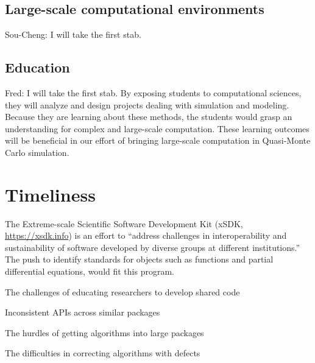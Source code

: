 \documentclass{amsart}
\newcommand{\FJHNote}[1]{{\color{blue}Fred: #1}}
\newcommand{\SCTCNote}[1]{{\color{green}Sou-Cheng: #1}}
\begin{document}
\subsection{Large-scale computational environments} \SCTCNote{I will take the first stab.}

\subsection{Education} \FJHNote{I will take the first stab.} %
By exposing students to computational sciences, they will analyze and design projects dealing with simulation and modeling. Because they are learning about these methods, the students would grasp an understanding for complex and large-scale computation. These learning outcomes will be beneficial in our effort of bringing large-scale computation in Quasi-Monte Carlo simulation.


\section{Timeliness} %

The Extreme-scale Scientific Software Development Kit (xSDK, \url{https://xsdk.info}) is an effort to ``address challenges in interoperability and sustainability of software developed by diverse groups at different institutions.'' The push to identify standards for objects such as functions and partial differential equations, would fit this program.

\printbibliography
%
%

The challenges of educating researchers to develop shared code

Inconsistent APIs across similar packages

The hurdles of getting algorithms into large packages

The difficulties in correcting algorithms with defects
\end{document}

